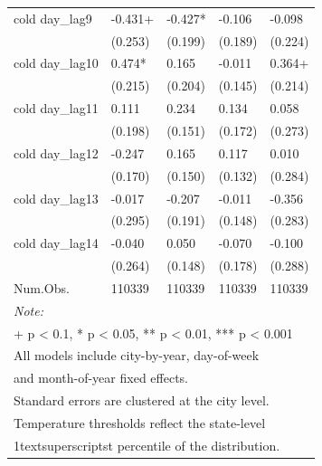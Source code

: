 \begin{table}
{\begin{tabular}[t]{lllll}
cold day_{lag9} & -0.431+ & -0.427* & -0.106 & -0.098\\

 & (0.253) & (0.199) & (0.189) & (0.224)\\

cold day_{lag10} & 0.474* & 0.165 & -0.011 & 0.364+\\

 & (0.215) & (0.204) & (0.145) & (0.214)\\

cold day_{lag11} & 0.111 & 0.234 & 0.134 & 0.058\\

 & (0.198) & (0.151) & (0.172) & (0.273)\\

cold day_{lag12} & -0.247 & 0.165 & 0.117 & 0.010\\

 & (0.170) & (0.150) & (0.132) & (0.284)\\

cold day_{lag13} & -0.017 & -0.207 & -0.011 & -0.356\\

 & (0.295) & (0.191) & (0.148) & (0.283)\\

cold day_{lag14} & -0.040 & 0.050 & -0.070 & -0.100\\

 & (0.264) & (0.148) & (0.178) & (0.288)\\

Num.Obs. & 110339 & 110339 & 110339 & 110339\\
\bottomrule
\multicolumn{5}{l}{\rule{0pt}{1em}\textit{Note: }}\\
\multicolumn{5}{l}{\rule{0pt}{1em}+ p < 0.1, * p < 0.05, ** p < 0.01, *** p < 0.001}\\
\multicolumn{5}{l}{\rule{0pt}{1em}All models include city-by-year, day-of-week}\\
\multicolumn{5}{l}{\rule{0pt}{1em}and month-of-year fixed effects.}\\
\multicolumn{5}{l}{\rule{0pt}{1em}Standard errors are clustered at the city level.}\\
\multicolumn{5}{l}{\rule{0pt}{1em}Temperature thresholds reflect the state-level}\\
\multicolumn{5}{l}{\rule{0pt}{1em}1textsuperscript{st} percentile of the distribution.}\\
\end{tabular}}
\end{table}
